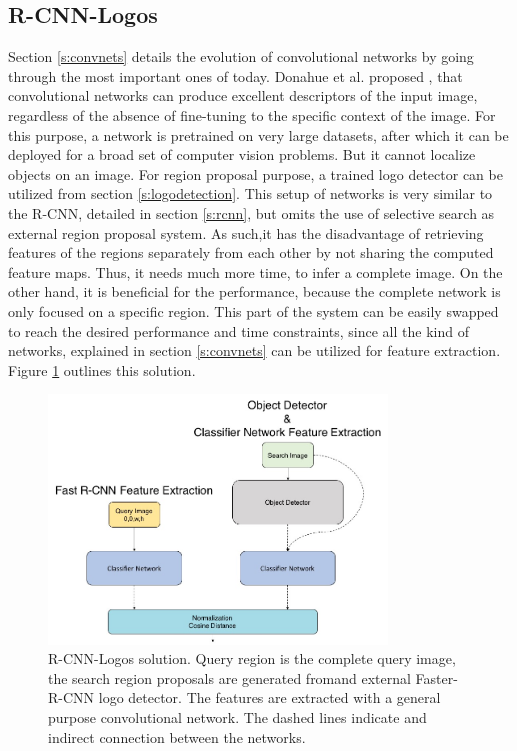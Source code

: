\subsection{R-CNN-Logos}\label{ss:solution4}
Section \ref{s:convnets} details the evolution of convolutional networks by going through the most important ones of today. Donahue et al. proposed \cite{DBLP:journals/corr/DonahueJVHZTD13}, that convolutional networks can produce excellent descriptors of the input image, regardless of the absence of fine-tuning to the specific context of the image. For this purpose, a network is pretrained on very large datasets, after which it can be deployed for a broad set of computer vision problems. But it cannot localize objects on an image. For region proposal purpose, a trained logo detector can be utilized from section \ref{s:logodetection}. This setup of networks is very similar to the R-CNN, detailed in section \ref{s:rcnn}, but omits the use of selective search as external region proposal system. As such,it has the disadvantage of retrieving features of the regions separately from each other by not sharing the computed feature maps. Thus, it needs much more time, to infer a complete image. On the other hand, it is beneficial for the performance, because the complete network is only focused on a specific region. This part of the system can be easily swapped to reach the desired performance and time constraints, since all the kind of networks, explained in section \ref{s:convnets} can be utilized for feature extraction. Figure \ref{f:sol4arch} outlines this solution.
\begin{figure}
  \centering
  \includegraphics[width=90mm]{images/mt/sol4_arch.jpg}
  \caption{R-CNN-Logos solution. Query region is the complete query image, the search region proposals are generated fromand external Faster-R-CNN logo detector. The features are extracted with a general purpose convolutional network. The dashed lines indicate and indirect connection between the networks.}
  \label{f:sol4arch}
\end{figure}


